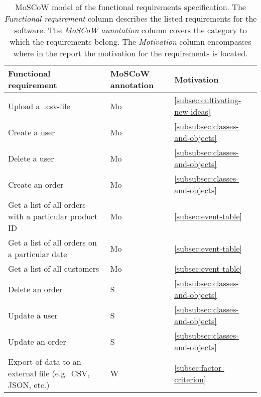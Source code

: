 \begin{table}[H]
    \begin{tabularx}{\textwidth}{ l X X }
        \toprule
        \textbf{Functional requirement}
        & \textbf{MoSCoW annotation}
        & \textbf{Motivation}
        \\ \midrule
        Upload a~.csv-file
        & Mo
        & {\ul{\ref{subsec:cultivating-new-ideas}}}
        \\ \midrule
        Create a user
        & Mo
        & {\ul{\ref{subsubsec:classes-and-objects}}}
        \\ \midrule
        Delete a user
        & Mo
        & {\ul{\ref{subsubsec:classes-and-objects}}}
        \\ \midrule
        Create an order
        & Mo
        & {\ul{\ref{subsubsec:classes-and-objects}}}
        \\ \midrule
        Get a list of all orders with a particular product ID
        & Mo
        & {\ul{\ref{subsec:event-table}}}
        \\ \midrule
        Get a list of all orders on a particular date
        & Mo
        & {\ul{\ref{subsec:event-table}}}
        \\ \midrule
        Get a list of all customers
        & Mo
        & {\ul{\ref{subsec:event-table}}}
        \\ \midrule
        Delete an order
        & S
        & {\ul{\ref{subsubsec:classes-and-objects}}}
        \\ \midrule
        Update a user
        & S
        & {\ul{\ref{subsubsec:classes-and-objects}}}
        \\ \midrule
        Update an order
        & S
        & {\ul{\ref{subsubsec:classes-and-objects}}}
        \\ \midrule
        Export of data to an external file (e.g.\ CSV, JSON, etc.)
        & W
        & {\ul{\ref{subsec:factor-criterion}}}
        \\ \bottomrule
    \end{tabularx}
    \caption{MoSCoW model of the functional requirements specification.
    The \textit{Functional requirement} column describes the listed requirements for the software.
    The \textit{MoSCoW annotation} column covers the category to which the requirements belong.
    The \textit{Motivation} column encompasses where in the report the motivation for the requirements is located.
    }\label{tab:functional-requirements-specification}
\end{table}

